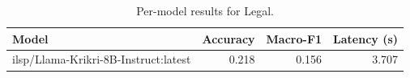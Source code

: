 \begin{table}[t]
\centering
\caption{Per-model results for Legal.}
\label{tab:appendix-legal-classification-analysis}
\begin{tabular}{lrrr}
\toprule
Model & Accuracy & Macro-F1 & Latency (s) \\
\midrule
ilsp/Llama-Krikri-8B-Instruct:latest & 0.218 & 0.156 & 3.707 \\
\bottomrule
\end{tabular}
\end{table}
